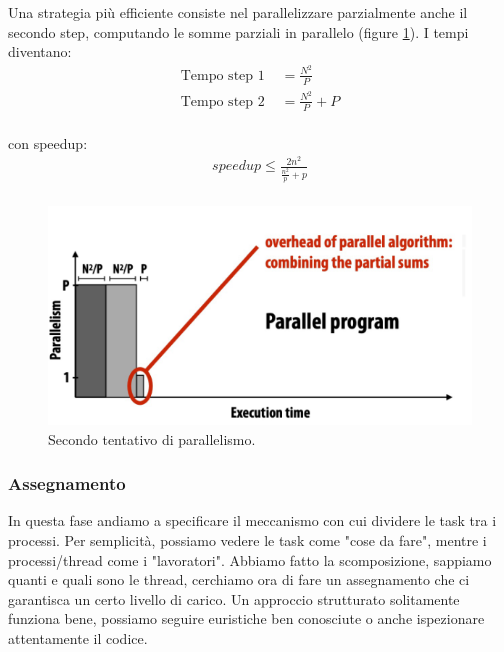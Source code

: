 Una strategia più efficiente consiste nel parallelizzare parzialmente anche il secondo step, computando le somme parziali in parallelo (figure \ref{fig:esecuzione-parallela-2}). I tempi diventano:
\begin{align*}
    \text{Tempo step 1 } &= \frac{N^2}{P}\\
    \text{Tempo step 2 } &= \frac{N^2}{P} + P\\
\end{align*}

con speedup:
\begin{align*}
    speedup \le \frac{2n^2}{\frac{n^2}{p} + p}\\
\end{align*}

\begin{figure}[th]
	\centering
	\includegraphics[width=0.7\linewidth]{img/esecuzione-parallela-2.png}
	\caption{Secondo tentativo di parallelismo.}
	\label{fig:esecuzione-parallela-2}
\end{figure}

\subsubsection{Assegnamento}
In questa fase andiamo a specificare il meccanismo con cui dividere le task tra i processi. Per semplicità, possiamo vedere le task come "cose da fare", mentre i processi/thread come i "lavoratori". Abbiamo fatto la scomposizione, sappiamo quanti e quali sono le thread, cerchiamo ora di fare un assegnamento che ci garantisca un certo livello di carico. 
Un approccio strutturato solitamente funziona bene, possiamo seguire euristiche ben conosciute o anche ispezionare attentamente il codice.


